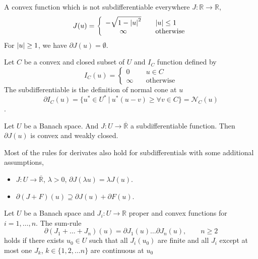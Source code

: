 \begin{example}
	A convex function which is not subdifferentiable everywhere $J:\mathbb{R} \rightarrow \mathbb{R}$, 
	\begin{equation*}
		J(u)=\left\lbrace\begin{array}{cl}
		 -\sqrt{1-\left|u\right|^2} &\quad \left|u\right|\leq 1 \\
		 \infty &\quad \text{otherwise}
		\end{array}
	\right.
	\end{equation*}
	For $\left|u\right|\geq 1$, we have $\partial J(u) = \emptyset$.
\end{example}

\begin{example}
	Let $C$ be a convex and closed subset of $U$ and $I_C$ function defined by
	\[
		I_C (u)=
		\left\lbrace
		\begin{array}{cl}
			0 \quad& u\in C \\
			\infty \quad& \text{otherwise}
		\end{array}
		\right.
	\]
	The subdifferentiable is the definition of normal cone at $u$
	\[\partial I_C (u)=\lbrace u^* \in U^* \ | \ u^*(u-v)\geq \forall v \in C\rbrace = \mathcal{N}_C(u)\].

\end{example}

\begin{theorem}
	Let $U$ be a Banach space. And $J: U\rightarrow \overline{\mathbb{R}}$ a subdifferentiable function. Then $\partial J(u)$ is convex and weakly closed.
\end{theorem}

\begin{remark}
	Most of the rules for derivates also hold for subdifferentials with some additional assumptions,
	\begin{itemize}
		\item $J:U\rightarrow \overline{\mathbb{R}}$, $\lambda > 0$, $\partial J(\lambda u)=\lambda J(u)$.
		\item $\partial(J+F)(u) \supseteq \partial J(u)+ \partial F(u)$.
	\end{itemize}
\end{remark}

\begin{theorem}
	\label{th5. Moreau-Rockafellar}
	Let $U$ be a Banach space and $J_i: U\rightarrow \mathbb{R}$ proper and convex functions for $i=1,\dots, n$.
	The sum-rule
	\[
		\partial(J_1+\dots+J_n)(u)=\partial J_1(u)\dots \partial J_n(u), \qquad n\geq 2
	\]
	holds if there exists $u_0 \in U$ such that all $J_i(u_0)$ are finite and all $J_i$ except at most one $J_k$, $k\in \lbrace 1,2,\dots n\rbrace$ are continuous at $u_0$
\end{theorem}